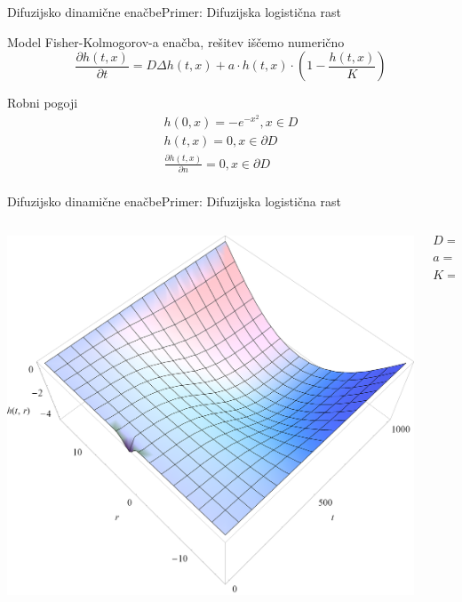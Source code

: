 \documentclass{beamer}
\begin{document}
\begin{frame}{Difuzijsko dinamične enačbe}{Primer: Difuzijska logistična rast}
\begin{block}{Model}
  Fisher-Kolmogorov-a enačba, rešitev iščemo numerično
  \begin{equation} \frac{ \partial h(t,x) }{ \partial t} = D \Delta h(t,x) + a \cdot h(t,x) \cdot (1 - \frac{h(t,x)}{K}) \end{equation} 
\end{block}
\begin{block}{Robni pogoji}
        \begin{equation}
          \begin{aligned}
            h(0,x) =  - e^{-x^2}, x \in D \\
            h(t,x) = 0, x \in \partial D \\
            \frac{\partial h(t,x)}{\partial n} = 0, x \in \partial D \\
          \end{aligned}
        \end{equation}
\end{block}
\end{frame}

\begin{frame}{Difuzijsko dinamične enačbe}{Primer: Difuzijska logistična rast}
\begin{columns}
  \begin{column}{0.8\textwidth}
    \includegraphics[width=1.05\textwidth]{slike/difuzija-logisticna-rast2.png}
  \end{column}
  \begin{column}{0.3\textwidth}
    \footnotesize
    \[ D = 1 \]
    \[ a = \frac{1}{50} \]
    \[ K = -10 \]
  \end{column}
\end{columns}
\end{frame}
\end{document}
